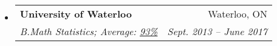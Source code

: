 \documentclass[letterpaper,11pt]{article}
\makeatletter
\newcommand{\resitem}[4]{\begin{tabular*}{17.5cm}{l@{\extracolsep{\fill}}r} \textbf{#1} & #2 \\ \textit{#3} & \textit{#4} \\ \end{tabular*} \vspace{-6pt}}
\makeatother
\begin{document}
\begin{itemize}
{	%
	\begin{comment}\footnotesize Key courses: Mixed Models, 
	Programming with R for Reproducible Research, 
	Statistical Learning Theory, 
	Data Science in TSE Systems,
	Advanced Topics in Computational Statistics, 
	Quantitative Big Imaging, 
	Applied Multivariate Statistics,
	\end{comment}
	\par} \vspace{-4pt}
\item 
	\resitem{University of Waterloo %
	}{Waterloo, ON}{B.Math Statistics;
	Average: \href{https://uwaterloo.ca/registrar/transcripts/transcript-legend}{93\%}}{Sept. 2013 -- June 2017} \vspace{2pt}
	\begin{comment}
	{\footnotesize Key Courses: Statistical Learning - Classification, 
	Data Visualization,
	Computational Inference, 
	Forecasting, 
	Statistical Learning - Function Estimation, 
	Sampling Theory and Practice, 
	Experimental Design, 
	Stochastic Processes
	\end{comment}

\end{itemize}
\end{document}
